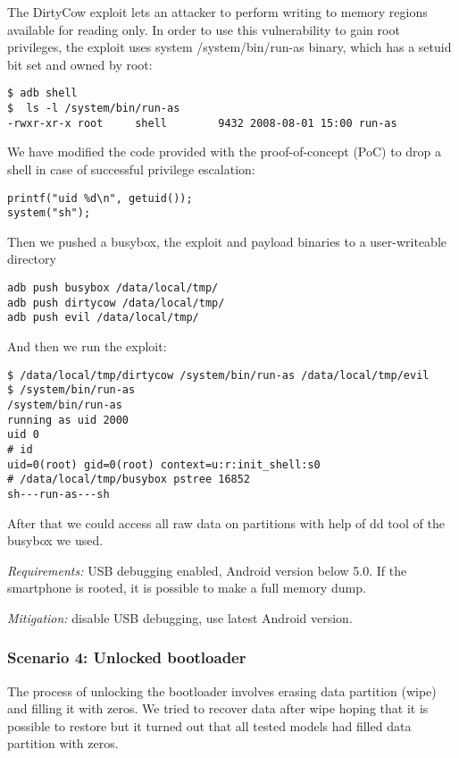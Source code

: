 The DirtyCow exploit lets an attacker to perform writing to memory regions available for reading only. In order to use this vulnerability to gain root privileges, the exploit uses system /system/bin/run-as binary, which has a setuid bit set and owned by root:

\begin{lstlisting}
$ adb shell
$  ls -l /system/bin/run-as
-rwxr-xr-x root     shell        9432 2008-08-01 15:00 run-as
\end{lstlisting}

We have modified the code provided with the proof-of-concept (PoC) to drop a shell in case of successful privilege escalation:

\begin{lstlisting}
printf("uid %d\n", getuid());
system("sh");
\end{lstlisting}

Then we pushed a busybox, the exploit and payload binaries to a user-writeable directory

\begin{lstlisting}
adb push busybox /data/local/tmp/
adb push dirtycow /data/local/tmp/
adb push evil /data/local/tmp/
\end{lstlisting}

And then we run the exploit:

\begin{lstlisting}
$ /data/local/tmp/dirtycow /system/bin/run-as /data/local/tmp/evil
$ /system/bin/run-as
/system/bin/run-as
running as uid 2000
uid 0
# id
uid=0(root) gid=0(root) context=u:r:init_shell:s0
# /data/local/tmp/busybox pstree 16852
sh---run-as---sh
\end{lstlisting}

After that we could access all raw data on partitions with help of dd tool of the busybox we used.


\textsl{Requirements:} USB debugging enabled, Android version below 5.0. If the smartphone is rooted, it is possible to make a full memory dump.

\textsl{Mitigation:} disable USB debugging, use latest Android version.

\subsubsection{Scenario 4: Unlocked bootloader}

The process of unlocking the bootloader involves erasing data partition (wipe) and filling it with zeros. We tried to recover data after wipe hoping that it is possible to restore but it turned out that all tested models had filled data partition with zeros.


